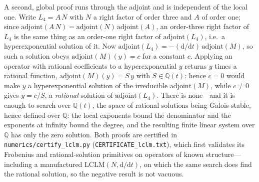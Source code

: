 \documentclass[cntp]{ipart}
\newcommand{\rmd}{\mathrm{d}}
\theoremstyle{plain}
\theoremstyle{remark}
\begin{document}
A second, global proof runs through the adjoint and is independent of the local one. Write $L_4=A\,N$ with $N$
a right factor of order three and $A$ of order one; since $\mathrm{adjoint}(A\,N)=\mathrm{adjoint}(N)\,
\mathrm{adjoint}(A)$, an order-three right factor of $L_4$ is the same thing as an order-one right factor of
$\mathrm{adjoint}(L_4)$, i.e.\ a hyperexponential solution of it. Now
$\mathrm{adjoint}(L_4)=-(\rmd/\rmd t)\,\mathrm{adjoint}(M)$, so such a solution obeys
$\mathrm{adjoint}(M)(y)=c$ for a constant $c$. Applying an operator with rational coefficients to a
hyperexponential $y$ returns $y$ times a rational function, $\mathrm{adjoint}(M)(y)=S\,y$ with
$S\in\overline{\mathbb{Q}}(t)$: hence $c=0$ would make $y$ a hyperexponential solution of the irreducible
$\mathrm{adjoint}(M)$, while $c\neq0$ gives $y=c/S$, a \emph{rational} solution of $\mathrm{adjoint}(L_4)$.
There is none---and it is enough to search over $\mathbb{Q}(t)$, the space of rational solutions being
Galois-stable, hence defined over $\mathbb{Q}$: the local exponents bound the denominator and the exponents at
infinity bound the degree, and the resulting finite linear system over $\mathbb{Q}$ has only the zero solution. Both proofs are certified in
\texttt{numerics/certify\_lclm.py} (\texttt{CERTIFICATE\_lclm.txt}), which first validates its Frobenius and
rational-solution primitives on operators of known structure---including a manufactured
$\mathrm{LCLM}(N,\rmd/\rmd t)$, on which the same search does find the rational solution, so the negative
result is not vacuous.
\end{document}
